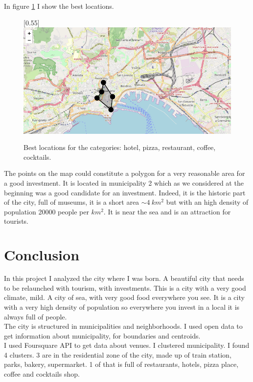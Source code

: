 \documentclass[a4paper, 12pt, oneside]{book}
\begin{document}
In figure \ref{fig:finalResult} I show the best locations.
\begin{figure}[!htb]
		\centering
		\scalebox{0.5}[0.55]{\includegraphics{immagini/finalResult.png}}
		\caption{Best locations for the categories: hotel, pizza, restaurant, coffee, cocktails.}
		\label{fig:finalResult}
	\end{figure}

\clearpage

The points on the map could constitute a polygon for a very reasonable area for a good investment. It is located in municipality 2 which as we considered at the beginning was a good candidate for an investment.
Indeed, it is the historic part of the city, full of museums, it is a short area $\sim 4 ~ km^2$ but with an high density of population 20000 people per $km^2$. It is near the sea and is an attraction for tourists. 


\clearpage
\chapter*{Conclusion}
\label{ch:conclusion}
In this project I analyzed the city where I was born. A beautiful city that needs to be relaunched with tourism, with investments. This is a city with a very good climate, mild. A city of sea, with very good food everywhere you see. It is a city with a very high density of population so everywhere you invest in a local it is always full of people.\\

The city is structured in municipalities and neighborhoods. 
I used open data to get information about municipality, for boundaries and centroids.\\

I used Foursquare API to get data about venues. I clustered municipality. I found 4 clusters. 3 are in the residential zone of the city, made up of train station, parks, bakery, supermarket. 1 of that is full of restaurants, hotels, pizza place, coffee and cocktails shop.\\
\end{document}
